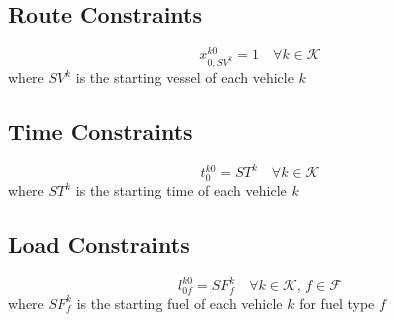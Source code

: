 \subsection{Route Constraints}
\begin{equation} \label{eq:20}
x_{0,SV^{k}}^{k0} = 1 \quad \forall k \in \mathcal{K}
\end{equation}
where $SV^{k}$ is the starting vessel of each vehicle $k$
\subsection{Time Constraints}
\begin{equation} \label{eq:21}
t_{0}^{k0} = ST^{k} \quad \forall k \in \mathcal{K}
\end{equation}
where $ST^{k}$ is the starting time of each vehicle $k$
\subsection{Load Constraints}
\begin{equation}\label{eq:22}
l_{0f}^{k0} = SF_{f}^{k} \quad \forall k \in \mathcal{K},\, f \in \mathcal{F}
\end{equation}
where $SF_{f}^{k}$ is the starting fuel of each vehicle $k$ for fuel type $f$




